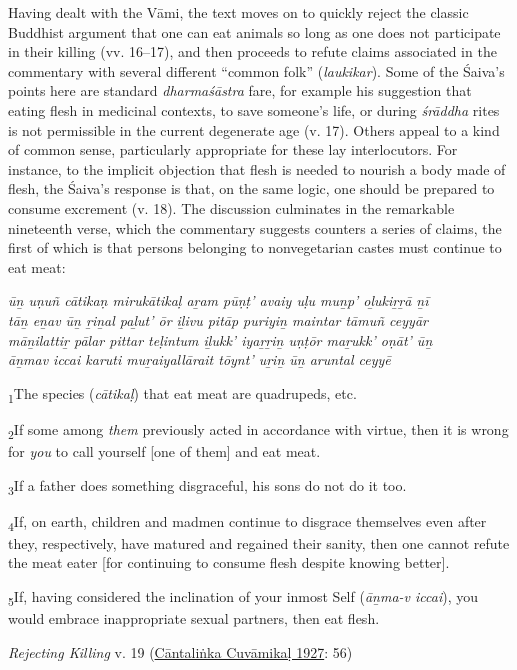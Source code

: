 Having dealt with the Vāmi, the text moves on to quickly reject the classic Buddhist argument that one can eat animals so long as one does not participate in their killing (vv. 16–17), and then proceeds to refute claims associated in the commentary with several different “common folk” (\emph{laukikar}). Some of the Śaiva’s points here are standard \emph{dharmaśāstra} fare, for example his suggestion that eating flesh in medicinal contexts, to save someone’s life, or during \emph{śrāddha} rites is not permissible in the current degenerate age (v. 17). Others appeal to a kind of common sense, particularly appropriate for these lay interlocutors. For instance, to the implicit objection that flesh is needed to nourish a body made of flesh, the Śaiva’s response is that, on the same logic, one should be prepared to consume excrement (v. 18). The discussion culminates in the remarkable nineteenth verse, which the commentary suggests counters a series of claims, the first of which is that persons belonging to nonvegetarian castes must continue to eat meat:

\begin{pullquote}\raggedright
      \emph{ūṉ uṇuñ cātikaṇ mirukātikaḷ aṟam pūṇṭ’ avaiy uḷu muṉp’ oḻukiṟṟā ṉī}\\
\emph{tāṉ eṉav ūṉ ṟiṉal paḻut’ ōr iḻivu pitāp puriyiṉ maintar tāmuñ ceyyār}\\
\emph{māṉilattiṟ pālar pittar teḷintum iḻukk’ iyaṟṟiṉ uṇṭōr maṟukk’ oṇāt’ ūṉ}\\
\emph{āṉmav iccai karuti muṟaiyallārait tōynt’ uṟiṉ ūṉ aruntal ceyyē}
\end{pullquote}
      
\begin{pullquote}
\textsubscript{1}The species (\emph{cātikaḷ}) that eat meat are quadrupeds, etc.\medskip


\textsubscript{2}If some among \emph{them} previously acted in accordance with virtue, then it is wrong for \emph{you} to call yourself [one of them] and eat meat.\medskip


\textsubscript{3}If a father does something disgraceful, his sons do not do it too. \medskip


\textsubscript{4}If, on earth, children and madmen continue to disgrace themselves even after they, respectively, have matured and regained their sanity, then one cannot refute the meat eater [for continuing to consume flesh despite knowing better]. \medskip


\textsubscript{5}If, having considered the inclination of your inmost Self (\emph{āṉma-v iccai}), you would embrace inappropriate sexual partners, then eat flesh.


\medskip\hfill\begin{minipage}{0.9\textwidth}\small\hfill
\emph{Rejecting Killing} v. 19 (\hyperref[CantalinkaCuvamikal1927]{Cāntaliṅka Cuvāmikaḷ 1927}: 56)\end{minipage}\hspace{2em}
\end{pullquote}

